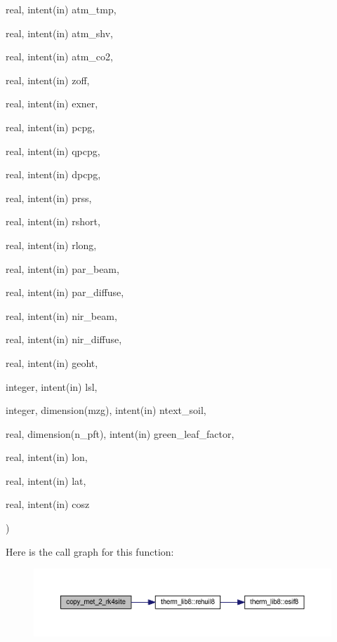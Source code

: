 {\begin{DoxyParamCaption}
\item[{real, intent(in)}]{atm\+\_\+tmp, }
\item[{real, intent(in)}]{atm\+\_\+shv, }
\item[{real, intent(in)}]{atm\+\_\+co2, }
\item[{real, intent(in)}]{zoff, }
\item[{real, intent(in)}]{exner, }
\item[{real, intent(in)}]{pcpg, }
\item[{real, intent(in)}]{qpcpg, }
\item[{real, intent(in)}]{dpcpg, }
\item[{real, intent(in)}]{prss, }
\item[{real, intent(in)}]{rshort, }
\item[{real, intent(in)}]{rlong, }
\item[{real, intent(in)}]{par\+\_\+beam, }
\item[{real, intent(in)}]{par\+\_\+diffuse, }
\item[{real, intent(in)}]{nir\+\_\+beam, }
\item[{real, intent(in)}]{nir\+\_\+diffuse, }
\item[{real, intent(in)}]{geoht, }
\item[{integer, intent(in)}]{lsl, }
\item[{integer, dimension(mzg), intent(in)}]{ntext\+\_\+soil, }
\item[{real, dimension(n\+\_\+pft), intent(in)}]{green\+\_\+leaf\+\_\+factor, }
\item[{real, intent(in)}]{lon, }
\item[{real, intent(in)}]{lat, }
\item[{real, intent(in)}]{cosz}
\end{DoxyParamCaption}
)}\hypertarget{rk4__integ__utils_8f90_a1c1388f3894670e417eb8e6f30414ec1}{}\label{rk4__integ__utils_8f90_a1c1388f3894670e417eb8e6f30414ec1}


Here is the call graph for this function\+:\nopagebreak
\begin{figure}[H]
\begin{center}
\leavevmode
\includegraphics[width=350pt]{rk4__integ__utils_8f90_a1c1388f3894670e417eb8e6f30414ec1_cgraph}
\end{center}
\end{figure}




